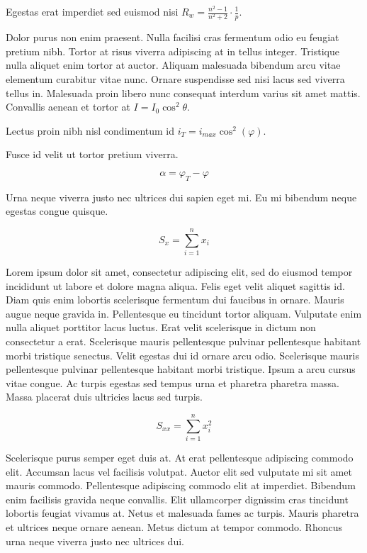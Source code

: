 \documentclass{article}
\begin{document}
	
    Egestas erat imperdiet sed euismod nisi 
    \begin{math}
    R_w=\frac{n^2-1}{n^2+2} \cdot \frac{1}{p}
    \end{math}.
    \newline
    
    Dolor purus non enim praesent. Nulla facilisi cras fermentum odio eu feugiat pretium nibh. Tortor at risus viverra adipiscing at in tellus integer. Tristique nulla aliquet enim tortor at auctor. Aliquam malesuada bibendum arcu vitae elementum curabitur vitae nunc. Ornare suspendisse sed nisi lacus sed viverra tellus in. Malesuada proin libero nunc consequat interdum varius sit amet mattis. Convallis aenean et tortor at $ I=I_0\cos ^2\theta $.
    \newline
    
    Lectus proin nibh nisl condimentum id \( i_T=i_{max}\cos ^2(\varphi) \).
    \newline
    
    Fusce id velit ut tortor pretium viverra.
    
    \[ \alpha=\varphi_T-\varphi  \]
    
    Urna neque viverra justo nec ultrices dui sapien eget mi. Eu mi bibendum neque egestas congue quisque.
    
    $$ S_x=\sum_{i=1}^{n}x_i $$
    
    Lorem ipsum dolor sit amet, consectetur adipiscing elit, sed do eiusmod tempor incididunt ut labore et dolore magna aliqua. Felis eget velit aliquet sagittis id. Diam quis enim lobortis scelerisque fermentum dui faucibus in ornare. Mauris augue neque gravida in. Pellentesque eu tincidunt tortor aliquam. Vulputate enim nulla aliquet porttitor lacus luctus. Erat velit scelerisque in dictum non consectetur a erat. Scelerisque mauris pellentesque pulvinar pellentesque habitant morbi tristique senectus. Velit egestas dui id ornare arcu odio. Scelerisque mauris pellentesque pulvinar pellentesque habitant morbi tristique. Ipsum a arcu cursus vitae congue. Ac turpis egestas sed tempus urna et pharetra pharetra massa. Massa placerat duis ultricies lacus sed turpis.
    
    \begin{displaymath}
    	S_{xx}=\sum_{i=1}^{n}x_i^2
    \end{displaymath}
    
   Scelerisque purus semper eget duis at. At erat pellentesque adipiscing commodo elit. Accumsan lacus vel facilisis volutpat. Auctor elit sed vulputate mi sit amet mauris commodo. Pellentesque adipiscing commodo elit at imperdiet. Bibendum enim facilisis gravida neque convallis. Elit ullamcorper dignissim cras tincidunt lobortis feugiat vivamus at. Netus et malesuada fames ac turpis. Mauris pharetra et ultrices neque ornare aenean. Metus dictum at tempor commodo. Rhoncus urna neque viverra justo nec ultrices dui.
    
\end{document}
